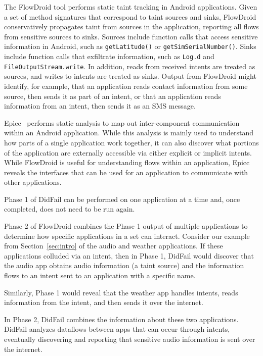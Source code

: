 The FlowDroid tool performs static taint tracking in Android applications. Given a set of method signatures that correspond to taint sources and sinks, FlowDroid conservatively propagates taint from sources in the application, reporting all flows from sensitive sources to sinks. Sources include function calls that access sensitive information in Android, such as \texttt{getLatitude()} or \texttt{getSimSerialNumber()}. Sinks include function calls that exfiltrate information, such as \texttt{Log.d} and \texttt{FileOutputStream.write}. In addition, reads from received intents are treated as sources, and writes to intents are treated as sinks. Output from FlowDroid might identify, for example, that an application reads contact information from some source, then sends it as part of an intent, or that an application reads information from an intent, then sends it as an SMS message.

Epicc~\cite{epicc} performs static analysis to map out inter-component communication within an Android application. While this analysis is mainly used to understand how parts of a single application work together, it can also discover what portions of the application are externally accessible via either explicit or implicit intents. While FlowDroid is useful for understanding flows within an application, Epicc reveals the interfaces that can be used for an application to communicate with other applications.

Phase 1 of DidFail can be performed on one application at a time and, once completed, does not need to be run again.

Phase 2 of FlowDroid combines the Phase 1 output of multiple applications to determine how specific applications in a set can interact. Consider our example from Section~\ref{sec:intro} of the audio and weather applications. If these applications colluded via an intent, then in Phase 1, DidFail would discover that the audio app obtains audio information (a taint source) and the information flows to an intent sent to an application with a specific name.

Similarly, Phase 1 would reveal that the weather app handles intents, reads information from the intent, and then sends it over the internet. 

In Phase 2, DidFail combines the information about these two applications. DidFail analyzes dataflows between apps that can occur through intents, eventually discovering and reporting that sensitive audio information is sent over the internet.

